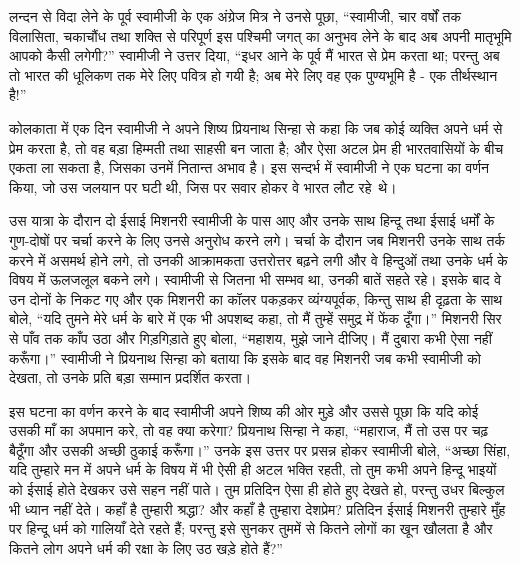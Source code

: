 \vskip -6pt

\delimiter

लन्दन से विदा लेने के पूर्व स्वामीजी के एक अंग्रेज मित्र ने उनसे पूछा, “स्वामीजी, चार वर्षों तक विलासिता, चकाचौंध तथा शक्ति से परिपूर्ण इस पश्चिमी जगत् का अनुभव लेने के बाद अब अपनी मातृभूमि आपको कैसी लगेगी?” स्वामीजी ने उत्तर दिया, “इधर आने के पूर्व मैं भारत से प्रेम करता था; परन्तु अब तो भारत की धूलिकण तक मेरे लिए पवित्र हो गयी है; अब मेरे लिए वह एक पुण्यभूमि है - एक तीर्थस्थान है!” 

\vskip -6pt

\delimiter

कोलकाता में एक दिन स्वामीजी ने अपने शिष्य प्रियनाथ सिन्हा से कहा कि जब कोई व्यक्ति अपने धर्म से प्रेम करता है, तो वह बड़ा हिम्मती तथा साहसी बन जाता है; और ऐसा अटल प्रेम ही भारतवासियों के बीच एकता ला सकता है, जिसका उनमें नितान्त अभाव है। इस सन्दर्भ में स्वामीजी ने एक घटना का वर्णन किया, जो उस जलयान पर घटी थी, जिस पर सवार होकर वे भारत लौट रहे~थे। 

उस यात्रा के दौरान दो ईसाई मिशनरी स्वामीजी के पास आए और उनके साथ हिन्दू तथा ईसाई धर्मों के गुण-दोषों पर चर्चा करने के लिए उनसे अनुरोध करने लगे। चर्चा के दौरान जब मिशनरी उनके साथ तर्क करने में असमर्थ होने लगे, तो उनकी आक्रामकता उत्तरोत्तर बढ़ने लगी और वे हिन्दुओं तथा उनके धर्म के विषय में ऊलजलूल बकने लगे। स्वामीजी से जितना भी सम्भव था, उनकी बातें सहते रहे। इसके बाद वे उन दोनों के निकट गए और एक मिशनरी का कॉलर पकड़कर व्यंग्यपूर्वक, किन्तु साथ ही दृढ़ता के साथ बोले, “यदि तुमने मेरे धर्म के बारे में एक भी अपशब्द कहा, तो मैं तुम्हें समुद्र में फेंक दूँगा।” मिशनरी सिर से पाँव तक काँप उठा और गिड़गिड़ाते हुए बोला, “महाशय, मुझे जाने दीजिए। मैं दुबारा कभी ऐसा नहीं करूँगा।” स्वामीजी ने प्रियनाथ सिन्हा को बताया कि इसके बाद वह मिशनरी जब कभी स्वामीजी को देखता, तो उनके प्रति बड़ा सम्मान प्रदर्शित करता। 

इस घटना का वर्णन करने के बाद स्वामीजी अपने शिष्य की ओर मुड़े और उससे पूछा कि यदि कोई उसकी माँ का अपमान करे, तो वह क्या करेगा? प्रियनाथ सिन्हा ने कहा, “महाराज, मैं तो उस पर चढ़ बैठूँगा और उसकी अच्छी ठुकाई करूँगा।” उनके इस उत्तर पर प्रसन्न होकर स्वामीजी बोले, “अच्छा सिंहा, यदि तुम्हारे मन में अपने धर्म के विषय में भी ऐसी ही अटल भक्ति रहती, तो तुम कभी अपने हिन्दू भाइयों को ईसाई होते देखकर उसे सहन नहीं पाते। तुम प्रतिदिन ऐसा ही होते हुए देखते हो, परन्तु उधर बिल्कुल भी ध्यान नहीं देते। कहाँ है तुम्हारी श्रद्धा? और कहाँ है तुम्हारा देशप्रेम? प्रतिदिन ईसाई मिशनरी तुम्हारे मुँह पर हिन्दू धर्म को गालियाँ देते रहते हैं; परन्तु इसे सुनकर तुममें से कितने लोगों का खून खौलता है और कितने लोग अपने धर्म की रक्षा के लिए उठ खड़े होते हैं?” 

